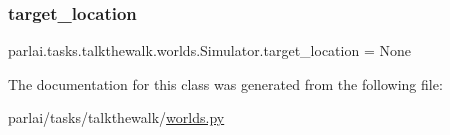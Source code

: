 \subsubsection{\texorpdfstring{target\+\_\+location}{target\_location}}
{\footnotesize\ttfamily parlai.\+tasks.\+talkthewalk.\+worlds.\+Simulator.\+target\+\_\+location = None\hspace{0.3cm}{\ttfamily [static]}}



The documentation for this class was generated from the following file\+:\begin{DoxyCompactItemize}
\item 
parlai/tasks/talkthewalk/\hyperlink{parlai_2tasks_2talkthewalk_2worlds_8py}{worlds.\+py}\end{DoxyCompactItemize}
